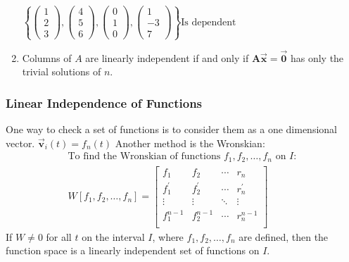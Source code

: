 \documentclass[12pt,landscape,twocolumn]{article}
\let\oldvec\vec
\renewcommand{\vec}[1]{\oldvec{\mathbf{ #1 } } }                    %
\begin{document}
\begin{enumerate}
            $
                \left\{
                \left(\begin{array}{c}
                    1\\
                    2\\
                    3
                \end{array}\right),
                \left(\begin{array}{c}
                    4\\
                    5\\
                    6
                \end{array}\right),
                \left(\begin{array}{c}
                    0\\
                    1\\
                    0
                \end{array}\right),
                \left(\begin{array}{c}
                    1\\
                    -3\\
                    7
                \end{array}\right)
                \right\} \text{Is dependent}
            $
        \item Columns of $A$ are linearly independent if and only if $\mathbf{A}\vec{x} = \vec{0}$ has only the trivial solutions of $n$.
        \end{enumerate}

        \subsubsection{Linear Independence of Functions}
        One way to check a set of functions is to consider them as a one dimensional vector.
        $
            \vec{v}_i (t) = f_n(t)
        $
        Another method is the Wronskian:
        \begin{equation}\label{eq:wronskian}
        \begin{aligned}
            \text{To find the Wronskian of functions } f_1, f_2, \ldots, f_n \text{ on } I:\\
            W[f_1, f_2, \ldots, f_n] = \left[ \begin{array}{cccc}
                    f_1 & f_2 & \cdots & r_n\\
                    f^{'}_1 & f^{'}_2 & \cdots & r^{'}_n\\
                    \vdots & \vdots & \ddots & \vdots\\
                    f^{n-1}_1 & f^{n-1}_2 & \cdots & r^{n-1}_n\\
            \end{array} \right]
        \end{aligned}
        \end{equation}
        If $W \neq 0$ for all $t$ on the interval $I$, where $f_1, f_2, \ldots, f_n$ are defined, then the function space is a linearly independent set of functions on $I$.
\end{document}
